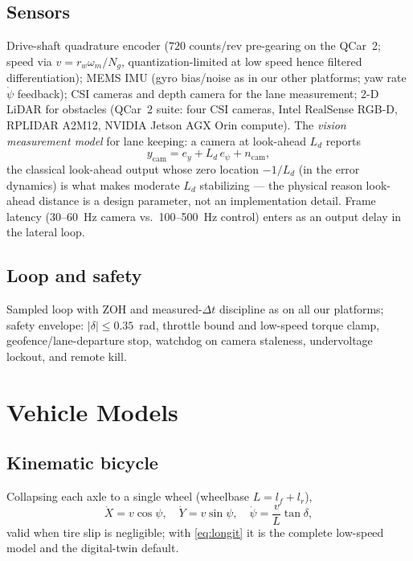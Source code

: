 \documentclass[conference]{IEEEtran}
\begin{document}
\subsection{Sensors}
Drive-shaft quadrature encoder ($720$ counts/rev pre-gearing on the QCar~2; speed via $v = r_w\omega_m/N_g$, quantization-limited at low speed hence filtered differentiation); MEMS IMU (gyro bias/noise as in our other platforms; yaw rate $\dot\psi$ feedback); CSI cameras and depth camera for the lane measurement; 2-D LiDAR for obstacles (QCar~2 suite: four CSI cameras, Intel RealSense RGB-D, RPLIDAR A2M12, NVIDIA Jetson AGX Orin compute). The \emph{vision measurement model} for lane keeping: a camera at look-ahead $L_d$ reports
\begin{equation}
y_{\mathrm{cam}} = e_y + L_d\,e_\psi + n_{\mathrm{cam}},
\label{eq:vision}
\end{equation}
the classical look-ahead output whose zero location $-1/L_d$ (in the error dynamics) is what makes moderate $L_d$ stabilizing --- the physical reason look-ahead distance is a design parameter, not an implementation detail. Frame latency (30--60~Hz camera vs.\ 100--500~Hz control) enters as an output delay in the lateral loop.

\subsection{Loop and safety}
Sampled loop with ZOH and measured-$\Delta t$ discipline as on all our platforms; safety envelope: $|\delta|\le0.35$~rad, throttle bound and low-speed torque clamp, geofence/lane-departure stop, watchdog on camera staleness, undervoltage lockout, and remote kill.

\section{Vehicle Models}
\subsection{Kinematic bicycle}
Collapsing each axle to a single wheel (wheelbase $L = l_f + l_r$),
\begin{equation}
\dot X = v\cos\psi,\quad
\dot Y = v\sin\psi,\quad
\dot\psi = \frac{v}{L}\tan\delta,
\label{eq:kinbike}
\end{equation}
valid when tire slip is negligible; with \eqref{eq:longit} it is the complete low-speed model and the digital-twin default.
\end{document}
